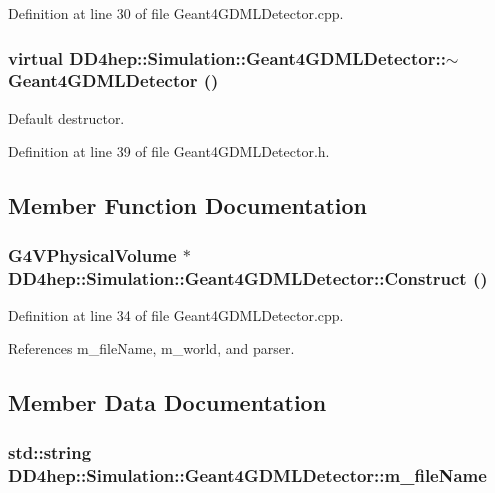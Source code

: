 Definition at line 30 of file Geant4GDMLDetector.cpp.\hypertarget{class_d_d4hep_1_1_simulation_1_1_geant4_g_d_m_l_detector_aab64ff1905c8d9dc0374ab8eaeade7eb}{
\subsubsection[{$\sim$Geant4GDMLDetector}]{\setlength{\rightskip}{0pt plus 5cm}virtual DD4hep::Simulation::Geant4GDMLDetector::$\sim$Geant4GDMLDetector ()}}
\label{class_d_d4hep_1_1_simulation_1_1_geant4_g_d_m_l_detector_aab64ff1905c8d9dc0374ab8eaeade7eb}


Default destructor. 

Definition at line 39 of file Geant4GDMLDetector.h.

\subsection{Member Function Documentation}
\hypertarget{class_d_d4hep_1_1_simulation_1_1_geant4_g_d_m_l_detector_ad7f7c697e1126a85187e06f94cbd4ad1}{
\subsubsection[{Construct}]{\setlength{\rightskip}{0pt plus 5cm}G4VPhysicalVolume $\ast$ DD4hep::Simulation::Geant4GDMLDetector::Construct ()}}
\label{class_d_d4hep_1_1_simulation_1_1_geant4_g_d_m_l_detector_ad7f7c697e1126a85187e06f94cbd4ad1}


Definition at line 34 of file Geant4GDMLDetector.cpp.

References m\_\-fileName, m\_\-world, and parser.

\subsection{Member Data Documentation}
\hypertarget{class_d_d4hep_1_1_simulation_1_1_geant4_g_d_m_l_detector_a48ddc632f08c696ac90deb8c27eaf43a}{
\subsubsection[{m\_\-fileName}]{\setlength{\rightskip}{0pt plus 5cm}std::string {\bf DD4hep::Simulation::Geant4GDMLDetector::m\_\-fileName}}}
\label{class_d_d4hep_1_1_simulation_1_1_geant4_g_d_m_l_detector_a48ddc632f08c696ac90deb8c27eaf43a}


